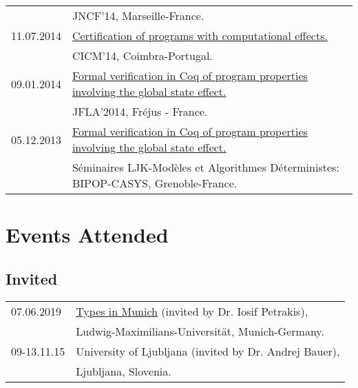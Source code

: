 \documentclass[a4paper,9pt]{article} %
\begin{document}
\begin{longtable}{ll}
& JNCF'14, Marseille-France.\\[0.25cm]
{\normalsize11.07.2014} & \href{http://ljk.imag.fr/membres/Burak.Ekici/CICM14/BurakEkici_presentation.pdf}{ Certification of programs with computational effects.} \\
& CICM'14, Coimbra-Portugal.\\[0.25cm]
{\normalsize09.01.2014} & \href{http://jfla.inria.fr/2014/ekici.pdf}{ Formal verification in Coq of program properties involving the global state effect.} \\
& JFLA'2014, Fréjus - France.\\[0.25cm]
{\normalsize05.12.2013} & \href{http://ljk.imag.fr/membres/Burak.Ekici/BurakEkici_LJK-Seminar.pdf}{Formal verification in Coq of program properties involving the global state effect.}\\
& Séminaires LJK-Modèles et Algorithmes Déterministes: BIPOP-CASYS, Grenoble-France.
\end{longtable}


\section*{Events Attended}
{\vskip4mm}
\subsection*{Invited}

\begin{tabular}{ll}	
{\small 07.06.2019} & \href{http://cj-xu.github.io/tim19/index.html}{Types in Munich} (invited by Dr. Iosif Petrakis),\\
& Ludwig-Maximilians-Universität, Munich-Germany.\\[0.25cm]
{\small09-13.11.15} & University of Ljubljana (invited by Dr. Andrej Bauer), \\
& Ljubljana, Slovenia.
\end{tabular}
\end{document}
